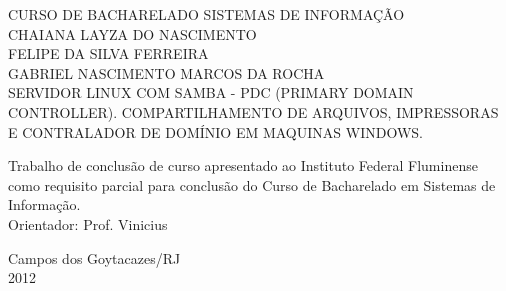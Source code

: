 \begin{titlepage}
 \begin{figure}[ht]
 \centering
 \end{figure}
 \begin{center}
   	{\large CURSO DE BACHARELADO SISTEMAS DE INFORMAÇÃO} \\ [3.5cm]
	{\large CHAIANA LAYZA DO NASCIMENTO} \\
	{\large FELIPE DA SILVA FERREIRA} \\	
	{\large GABRIEL NASCIMENTO MARCOS DA ROCHA} \\ [4cm]
   	{\large SERVIDOR LINUX COM SAMBA - PDC (PRIMARY DOMAIN CONTROLLER). COMPARTILHAMENTO DE ARQUIVOS, IMPRESSORAS E CONTRALADOR DE DOMÍNIO EM MAQUINAS WINDOWS.}\\ [2cm]
   \hspace{.45\textwidth} %
   \begin{minipage}{0.5\textwidth}
   \begin{espacosimples}
        Trabalho de conclusão de curso apresentado ao Instituto Federal Fluminense como requisito parcial para conclusão do Curso de Bacharelado em Sistemas de Informação.\\[1.5cm]
        Orientador: Prof. Vinicius
    \end{espacosimples}
    \end{minipage}
   \vfill
   {\large Campos dos Goytacazes/RJ} \\
   {\large 2012}
 \end{center}
\end{titlepage}
